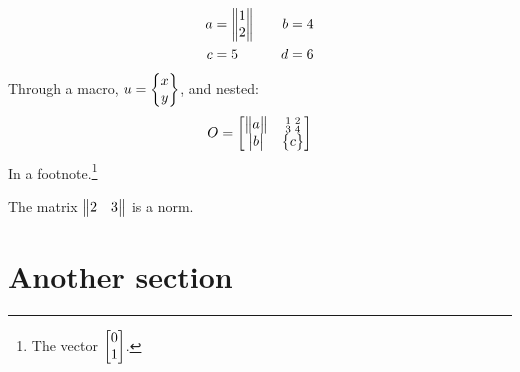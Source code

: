 \begin{alignat}{2}
a &= \Vmatrix 1 \\ 2 \endVmatrix &\quad b &= 4 \\
c &= 5 &\quad d &= 6
\end{alignat}
Through a macro, $u = \col{x}{y}$, and nested:
\[ O = \bmatrix \Vmatrix a \endVmatrix & \smallmatrix 1 & 2 \\ 3 & 4 \endsmallmatrix \\
  \vmatrix b \endvmatrix & \Bmatrix c \endBmatrix \endbmatrix \]
In a footnote.\footnote{The vector $\bmatrix 0 \\ 1 \endbmatrix$.}

\begin{theorem}
The matrix $\Vmatrix 2 & 3 \endVmatrix$ is a norm.
\end{theorem}

\section{Another section}

